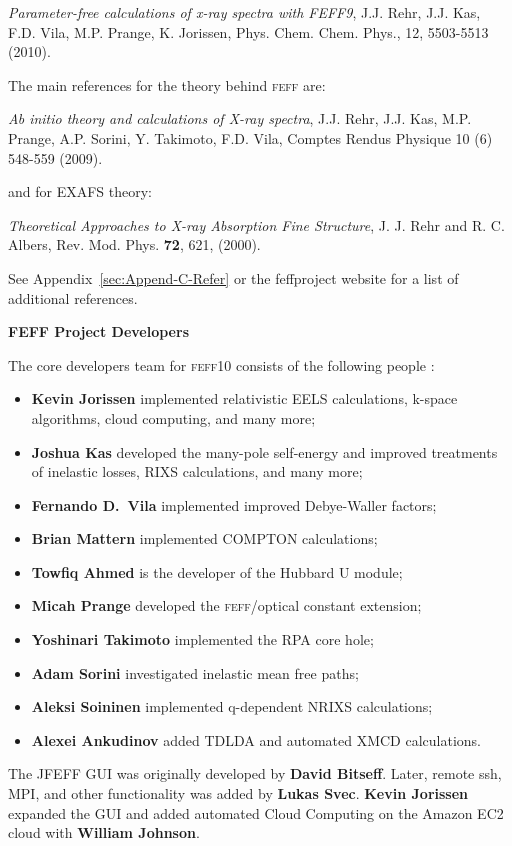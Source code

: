 \documentclass[11pt,oneside]{report} %
\newcommand{\program}[1]{\textsc{#1}}
\newcommand{\feff}{\program{feff}}
\newcommand{\vnum}{10}
\newcommand{\feffcur}{\feff\vnum}
\begin{document}
\begin{latexonly}
\emph{Parameter-free calculations of x-ray spectra with FEFF9},
J.J. Rehr, J.J. Kas, F.D. Vila, M.P. Prange, K. Jorissen,
Phys. Chem. Chem. Phys., 12, 5503-5513 (2010).


The main references for the theory behind {\feff} are:

\emph{Ab initio theory and calculations of X-ray spectra},
 J.J. Rehr, J.J. Kas, M.P. Prange, A.P. Sorini, Y. Takimoto, F.D. Vila, Comptes Rendus Physique 10 (6) 548-559 (2009).
 
and for EXAFS theory:

\emph{Theoretical Approaches to X-ray Absorption Fine Structure},
J. J. Rehr and R. C. Albers, Rev. Mod. Phys. {\bf72}, 621, (2000).
 
See Appendix~\ref{sec:Append-C-Refer}  or the feffproject website for a list of additional references.

 
 

\medskip

{\bf FEFF Project Developers}

 The core developers team for {\feffcur} consists of the following people :
\begin{itemize}
\label{developers} 
\item {\bf Kevin Jorissen} implemented relativistic EELS calculations, k-space algorithms, cloud computing, and many more;
\item {\bf Joshua Kas} developed the many-pole self-energy and improved treatments of inelastic losses, RIXS calculations, and many more;
\item {\bf Fernando D.\ Vila} implemented improved Debye-Waller factors;
\item {\bf Brian Mattern} implemented COMPTON calculations;
\item {\bf Towfiq Ahmed} is the developer of the Hubbard U module;
\item {\bf Micah Prange} developed the {\feff}/optical constant extension; 
\item {\bf Yoshinari Takimoto} implemented the RPA core hole;
\item {\bf Adam Sorini} investigated inelastic mean free paths;
\item {\bf Aleksi Soininen} implemented q-dependent NRIXS calculations;
\item {\bf Alexei Ankudinov} added TDLDA and automated XMCD calculations.
\end{itemize}

The JFEFF GUI was originally developed by {\bf David Bitseff}. 
Later, remote ssh, MPI, and other functionality was added by
{\bf Lukas Svec}. {\bf Kevin Jorissen} expanded the GUI and added automated Cloud Computing on the Amazon EC2 cloud with {\bf William Johnson}.


\end{latexonly}
\end{document}
